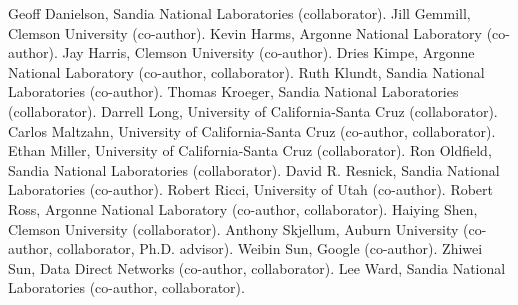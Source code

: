 \documentclass[11pt]{article}
\begin{document}
Geoff Danielson, Sandia National Laboratories (collaborator).
Jill Gemmill, Clemson University (co-author).
Kevin Harms, Argonne National Laboratory (co-author).
Jay Harris, Clemson University (co-author).
Dries Kimpe, Argonne National Laboratory (co-author, collaborator).
Ruth Klundt, Sandia National Laboratories (co-author).
Thomas Kroeger, Sandia National Laboratories (collaborator).
Darrell Long, University of California-Santa Cruz (collaborator).
Carlos Maltzahn, University of California-Santa Cruz (co-author, collaborator).
Ethan Miller, University of California-Santa Cruz (collaborator).
Ron Oldfield, Sandia National Laboratories (collaborator).
David R. Resnick, Sandia National Laboratories (co-author).
Robert Ricci, University of Utah (co-author).
Robert Ross, Argonne National Laboratory (co-author, collaborator).
Haiying Shen, Clemson University (collaborator).
Anthony Skjellum, Auburn University (co-author, collaborator, Ph.D. advisor).
Weibin Sun, Google (co-author).
Zhiwei Sun, Data Direct Networks (co-author, collaborator).
Lee Ward, Sandia National Laboratories (co-author, collaborator).

\end{document}
